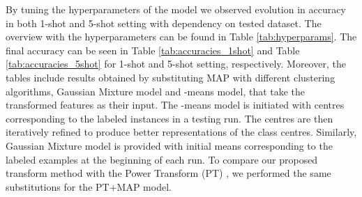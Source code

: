 \documentclass[letterpaper]{article} \usepackage{aaai20}  \usepackage{times}  \usepackage{helvet} \usepackage{courier}  \usepackage[hyphens]{url}  \usepackage{graphicx} \urlstyle{rm} \def\UrlFont{\rm}  \usepackage{graphicx}  \frenchspacing  \setlength{\pdfpagewidth}{8.5in}  \setlength{\pdfpageheight}{11in}  \usepackage[ruled,vlined]{algorithm2e}
\begin{document}
\begin{table}[h!]
\caption{1-shot accuracy of models based on Power Transform (PT), our proposed Latent Space Transform (LST) and WideResNet backbone.}
\vspace{5mm}
\label{tab:accuracies_1shot}
\centering
{}
\end{table}

By tuning the hyperparameters of the model we observed evolution in accuracy in both 1-shot and 5-shot setting with dependency on tested dataset. The overview with the hyperparameters can be found in Table \ref{tab:hyperparams}. The final accuracy can be seen in Table \ref{tab:accuracies_1shot} and Table \ref{tab:accuracies_5shot} for 1-shot and 5-shot setting, respectively. Moreover, the tables include results obtained by substituting MAP with different clustering algorithms, Gaussian Mixture model and -means model, that take the transformed features as their input. The -means model is initiated with centres corresponding to the labeled instances in a testing run. The centres are then iteratively refined to produce better representations of the class centres. Similarly, Gaussian Mixture model is provided with initial means corresponding to the labeled examples at the beginning of each run. To compare our proposed transform method with the Power Transform (PT) \cite{hu2020leveraging}, we performed the same substitutions for the PT+MAP model. 
\end{document}
